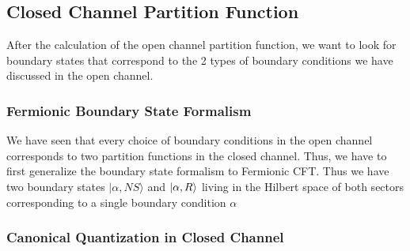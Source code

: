 \subsection{Closed Channel Partition Function}
After the calculation of the open channel partition function, we want to look for boundary states that correspond to the 2 types of boundary conditions we have discussed in the open channel.

\subsubsection{Fermionic Boundary State Formalism}
We have seen that every choice of boundary conditions in the open channel corresponds to two partition functions in the closed channel. Thus, we have to first generalize the boundary state formalism to Fermionic CFT.
Thus we have two boundary states $ |\alpha, NS \rangle $ and  $ \ket{\alpha,R} $ living in the Hilbert space of both sectors corresponding to a single boundary condition $ \alpha $

\subsubsection{Canonical Quantization in Closed Channel}


